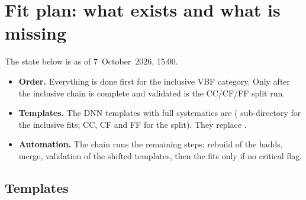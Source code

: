 \documentclass[11pt,a4paper]{article}
\begin{document}
\section{Fit plan: what exists and what is missing}\label{sec:plan}

The state below is as of 7~October~2026, 15:00.
\begin{itemize}
  \item \textbf{Order.} Everything is done first for the inclusive VBF
  category. Only after the inclusive chain is complete and validated is the
  CC/CF/FF split run.
  \item \textbf{Templates.} The DNN templates with full systematics are
   ( sub-directory for the inclusive
  fits; CC, CF and FF for the split). They replace .
  \item \textbf{Automation.} The chain
   runs the remaining
  steps: rebuild of the hadds, merge, validation of the shifted templates, then
  the fits only if no critical flag.
\end{itemize}

\subsection{Templates}
\end{document}
